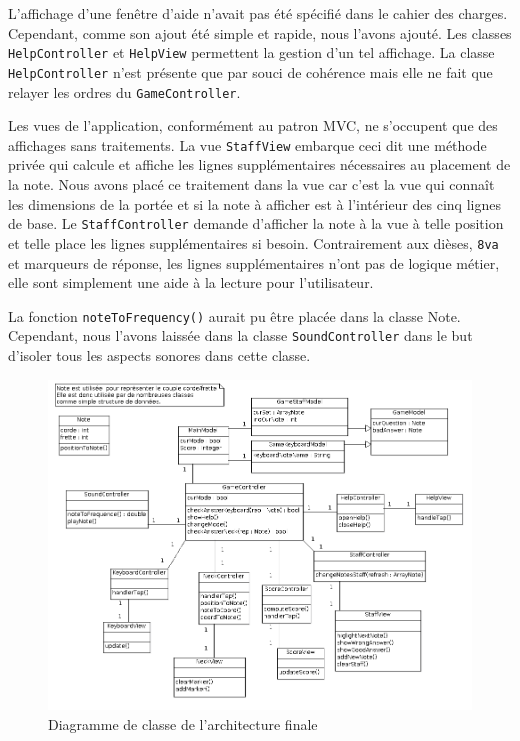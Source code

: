 \documentclass{scrreprt}
\begin{document}
L'affichage d'une fenêtre d'aide n'avait pas été spécifié dans le cahier des charges.
Cependant, comme son ajout été simple et rapide, nous l'avons ajouté.
Les classes \texttt{HelpController} et \texttt{HelpView} permettent la gestion d'un tel affichage.
La classe \texttt{HelpController} n'est présente que par souci de cohérence mais elle ne fait que relayer les ordres du \texttt{GameController}.
\newline

Les vues de l'application, conformément au patron MVC, ne s'occupent que des affichages sans traitements.
La vue \texttt{StaffView} embarque ceci dit une méthode privée qui calcule et affiche les lignes supplémentaires nécessaires au placement de la note.
Nous avons placé ce traitement dans la vue car c'est la vue qui connaît les dimensions de la portée et si la note à afficher est à l'intérieur des cinq lignes de base.
Le \texttt{StaffController} demande d'afficher la note à la vue à telle position et telle place les lignes supplémentaires si besoin.
Contrairement aux dièses, \texttt{8va} et marqueurs de réponse, les lignes supplémentaires n'ont pas de logique métier, elle sont simplement une aide à la lecture pour l'utilisateur.
\newline

La fonction \texttt{noteToFrequency()} aurait pu être placée dans la classe Note.
Cependant, nous l'avons laissée dans la classe \texttt{SoundController} dans le but d'isoler tous les aspects sonores dans cette classe.
\newline

\begin{figure}[!ht]
  \centering\includegraphics[width=\textwidth]{images/Diagrammedeclasses.png}
      \caption{Diagramme de classe de l'architecture finale}
\end{figure}
\end{document}
